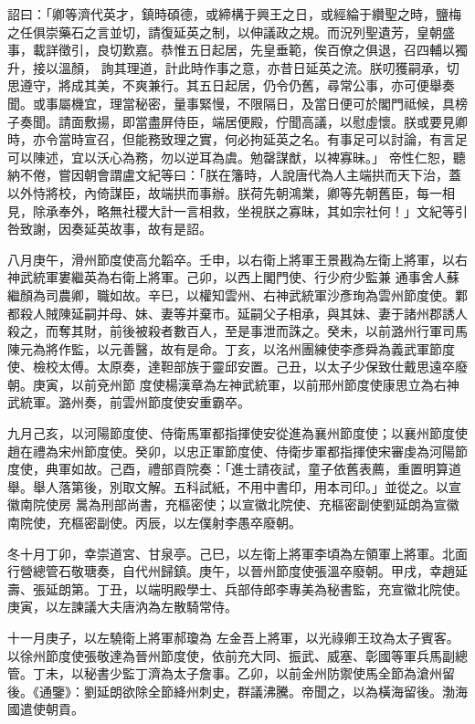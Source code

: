 \begin{pinyinscope}
 詔曰：「卿等濟代英才，鎮時碩德，或締構于興王之日，或經綸于纘聖之時，鹽梅之任俱崇藥石之言並切，請復延英之制，以伸議政之規。而況列聖遺芳，皇朝盛事，載詳徵引，良切歎嘉。恭惟五日起居，先皇垂範，俟百僚之俱退，召四輔以獨升，接以溫顏，
 詢其理道，計此時作事之意，亦昔日延英之流。朕叨獲嗣承，切思遵守，將成其美，不爽兼行。其五日起居，仍令仍舊，尋常公事，亦可便舉奏聞。或事屬機宜，理當秘密，量事緊慢，不限隔日，及當日便可於閣門祗候，具榜子奏聞。請面敷揚，即當盡屏侍臣，端居便殿，佇聞高議，以慰虛懷。朕或要見卿時，亦令當時宣召，但能務致理之實，何必拘延英之名。有事足可以討論，有言足可以陳述，宜以沃心為務，勿以逆耳為虞。勉罄謀猷，以裨寡昧。」
 帝性仁恕，聽納不倦，嘗因朝會謂盧文紀等曰：「朕在籓時，人說唐代為人主端拱而天下治，蓋以外恃將校，內倚謀臣，故端拱而事辦。朕荷先朝鴻業，卿等先朝舊臣，每一相見，除承奉外，略無社稷大計一言相救，坐視朕之寡昧，其如宗社何！」文紀等引咎致謝，因奏延英故事，故有是詔。



 八月庚午，滑州節度使高允韜卒。壬申，以右衛上將軍王景戡為左衛上將軍，以右神武統軍婁繼英為右衛上將軍。己卯，以西上閣門使、行少府少監兼
 通事舍人蘇繼顏為司農卿，職如故。辛巳，以權知雲州、右神武統軍沙彥珣為雲州節度使。鄴都殺人賊陳延嗣并母、妹、妻等并棄市。延嗣父子相承，與其妹、妻于諸州郡誘人殺之，而奪其財，前後被殺者數百人，至是事泄而誅之。癸未，以前潞州行軍司馬陳元為將作監，以元善醫，故有是命。丁亥，以洺州團練使李彥舜為義武軍節度使、檢校太傅。太原奏，達靼部族于靈邱安置。己丑，以太子少保致仕戴思遠卒廢朝。庚寅，以前兗州節
 度使楊漢章為左神武統軍，以前邢州節度使康思立為右神武統軍。潞州奏，前雲州節度使安重霸卒。



 九月己亥，以河陽節度使、侍衛馬軍都指揮使安從進為襄州節度使；以襄州節度使趙在禮為宋州節度使。癸卯，以忠正軍節度使、侍衛步軍都指揮使宋審虔為河陽節度使，典軍如故。己酉，禮部貢院奏：「進士請夜試，童子依舊表薦，重置明算道舉。舉人落第後，別取文解。五科試紙，不用中書印，用本司印。」並從之。以宣徽南院使房
 暠為刑部尚書，充樞密使；以宣徽北院使、充樞密副使劉延朗為宣徽南院使，充樞密副使。丙辰，以左僕射李愚卒廢朝。



 冬十月丁卯，幸崇道宮、甘泉亭。己巳，以左衛上將軍李頃為左領軍上將軍。北面行營總管石敬瑭奏，自代州歸鎮。庚午，以晉州節度使張溫卒廢朝。甲戌，幸趙延壽、張延朗第。丁丑，以端明殿學士、兵部侍郎李專美為秘書監，充宣徽北院使。庚寅，以左諫議大夫唐汭為左散騎常侍。



 十一月庚子，以左驍衛上將軍郝瓊為
 左金吾上將軍，以光祿卿王玟為太子賓客。以徐州節度使張敬達為晉州節度使，依前充大同、振武、威塞、彰國等軍兵馬副總管。丁未，以秘書少監丁濟為太子詹事。乙卯，以前金州防禦使馬全節為滄州留後。《通鑒》：劉延朗欲除全節絳州刺史，群議沸騰。帝聞之，以為橫海留後。渤海國遣使朝貢。




\end{pinyinscope}
